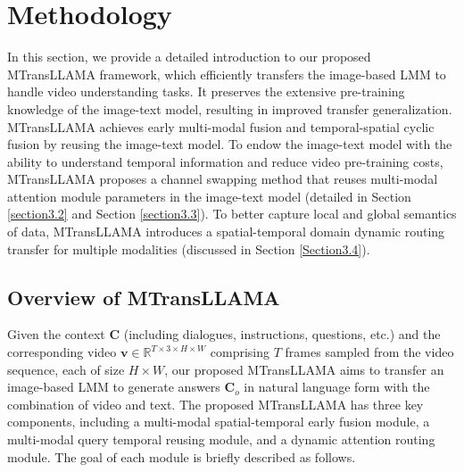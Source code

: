 \section{Methodology}

In this section, we provide a detailed introduction to our proposed MTransLLAMA framework, which efficiently transfers the image-based LMM to handle video understanding tasks. It preserves the extensive pre-training knowledge of the image-text model, resulting in improved transfer generalization. MTransLLAMA achieves early multi-modal fusion and temporal-spatial cyclic fusion by reusing the image-text model. To endow the image-text model with the ability to understand temporal information and reduce video pre-training costs, MTransLLAMA proposes a channel swapping method that reuses multi-modal attention module parameters in the image-text model (detailed in Section \ref{section3.2} and Section \ref{section3.3}). 
To better capture local and global semantics of data,
MTransLLAMA introduces a spatial-temporal domain dynamic routing transfer for multiple modalities (discussed in Section \ref{Section3.4}).

\subsection{Overview of MTransLLAMA}

Given the context $\mathbf{C}$ (including dialogues, instructions, questions, etc.) and the corresponding video $\mathbf{v} \in \mathbb{R}^{T \times 3 \times H \times W}$ comprising $T$ frames sampled from the video sequence, each of size $H \times W$, our proposed MTransLLAMA aims to transfer an image-based LMM to generate answers $\mathbf{C}_o$ in natural language form with the combination of video and text. 
The proposed MTransLLAMA has three key components, including a multi-modal spatial-temporal early fusion module, a multi-modal query temporal reusing module, and a dynamic attention routing module. The goal of each module is briefly described as follows.


